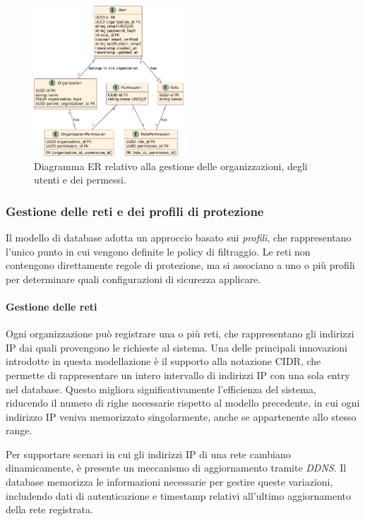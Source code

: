 \begin{figure}
  \centering
  \includegraphics[width=0.5\textwidth]{figures/db-user-organization.pdf}
  \caption{Diagramma ER relativo alla gestione delle organizzazioni, degli utenti e dei permessi.}
  \label{fig:organization-user-permissions}
\end{figure}

\subsubsection{Gestione delle reti e dei profili di protezione}
Il modello di database adotta un approccio basato sui \emph{profili}, che rappresentano l’unico punto in cui vengono definite le policy di filtraggio. Le reti non contengono direttamente regole di protezione, ma si associano a uno o più profili per determinare quali configurazioni di sicurezza applicare.

\paragraph{Gestione delle reti}
Ogni organizzazione può registrare una o più reti, che rappresentano gli indirizzi IP dai quali provengono le richieste al sistema. Una delle principali innovazioni introdotte in questa modellazione è il supporto alla notazione CIDR, che permette di rappresentare un intero intervallo di indirizzi IP con una sola entry nel database. Questo migliora significativamente l’efficienza del sistema, riducendo il numero di righe necessarie rispetto al modello precedente, in cui ogni indirizzo IP veniva memorizzato singolarmente, anche se appartenente allo stesso range.

Per supportare scenari in cui gli indirizzi IP di una rete cambiano dinamicamente, è presente un meccanismo di aggiornamento tramite \emph{DDNS}. Il database memorizza le informazioni necessarie per gestire queste variazioni, includendo dati di autenticazione e timestamp relativi all’ultimo aggiornamento della rete registrata.

